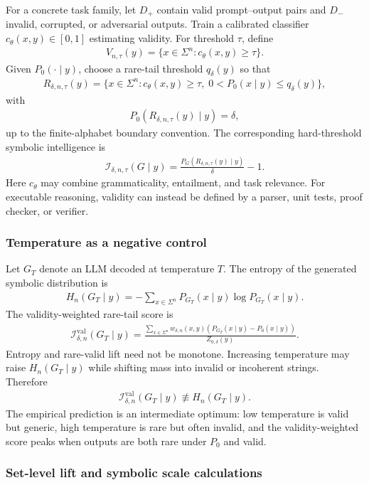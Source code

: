 \documentclass[
  aps,
  prresearch,
  reprint,
  amsmath,
  amssymb,
  superscriptaddress,
  nofootinbib,
  longbibliography
]{revtex4-2}
\def\EQSP{3pt}
\newcommand{\cgather}[2][\EQSP]{\begingroup\setlength\abovedisplayskip{#1}\setlength\belowdisplayskip{#1}\begin{gather} #2 \end{gather}\endgroup\noindent}
\newcommand{\cgathers}[2][\EQSP]{\begingroup\setlength\abovedisplayskip{#1}\setlength\belowdisplayskip{#1}\begin{gather*} #2 \end{gather*}\endgroup\noindent}
\newcommand{\calI}{\mathcal{I}}
\begin{document}
For a concrete task family, let \(D_+\) contain valid prompt--output pairs and \(D_-\) invalid, corrupted, or adversarial outputs. Train a calibrated classifier \(c_\theta(x,y)\in[0,1]\) estimating validity. For threshold \(\tau\), define
\cgather{
    V_{n,\tau}(y)
    =
    \{x\in\Sigma^n:c_\theta(x,y)\geq \tau\}.
}
Given \(P_0(\cdot\mid y)\), choose a rare-tail threshold \(q_\delta(y)\) so that
\cgathers{
    R_{\delta,n,\tau}(y)
    =
    \{x\in\Sigma^n:
    c_\theta(x,y)\geq\tau,\;
    0<P_0(x\mid y)\leq q_\delta(y)
    \},
}
with
\cgather{
    P_0(R_{\delta,n,\tau}(y)\mid y)
    =
    \delta,
    \label{eq:sym_operational_mass}
}
up to the finite-alphabet boundary convention. The corresponding hard-threshold symbolic intelligence is
\cgather{
    \calI_{\delta,n,\tau}(G\mid y)
    =
    \frac{
    P_G(R_{\delta,n,\tau}(y)\mid y)
    }
    {\delta}
    -1.
    \label{eq:sym_operational_I}
}
Here \(c_\theta\) may combine grammaticality, entailment, and task relevance. For executable reasoning, validity can instead be defined by a parser, unit tests, proof checker, or verifier.

\subsubsection{Temperature as a negative control}
Let \(G_T\) denote an LLM decoded at temperature \(T\). The entropy of the generated symbolic distribution is
\cgather{
    H_n(G_T\mid y)
    =
    -\sum_{x\in\Sigma^n}
    P_{G_T}(x\mid y)
    \log P_{G_T}(x\mid y).
}
The validity-weighted rare-tail score is
\cgathers{
    \calI_{\delta,n}^{\mathrm{val}}(G_T\mid y)
    =
    \frac{
    \sum_{x\in\Sigma^n}
    w_{\delta,n}(x,y)
    \left(P_{G_T}(x\mid y)-P_0(x\mid y)\right)
    }
    {Z_{0,\delta}(y)}.
}
Entropy and rare-valid lift need not be monotone. Increasing temperature may raise \(H_n(G_T\mid y)\) while shifting mass into invalid or incoherent strings. Therefore
\cgather{
    \calI_{\delta,n}^{\mathrm{val}}(G_T\mid y)
    \not\equiv
    H_n(G_T\mid y).
}
The empirical prediction is an intermediate optimum: low temperature is valid but generic, high temperature is rare but often invalid, and the validity-weighted score peaks when outputs are both rare under \(P_0\) and valid.

\subsubsection{Set-level lift and symbolic scale calculations}
\end{document}
